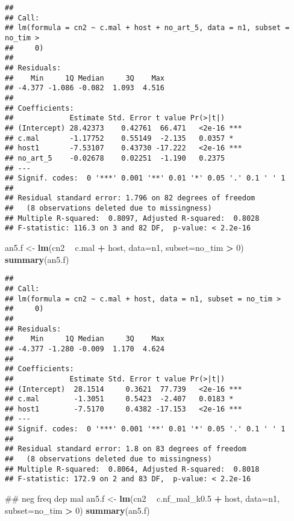 \documentclass[]{article}
\newenvironment{Shaded}{\begin{snugshade}}{\end{snugshade}}
\newcommand{\KeywordTok}[1]{\textcolor[rgb]{0.13,0.29,0.53}{\textbf{#1}}}
\newcommand{\DataTypeTok}[1]{\textcolor[rgb]{0.13,0.29,0.53}{#1}}
\newcommand{\DecValTok}[1]{\textcolor[rgb]{0.00,0.00,0.81}{#1}}
\newcommand{\StringTok}[1]{\textcolor[rgb]{0.31,0.60,0.02}{#1}}
\newcommand{\OperatorTok}[1]{\textcolor[rgb]{0.81,0.36,0.00}{\textbf{#1}}}
\newcommand{\NormalTok}[1]{#1}
\begin{document}
\begin{verbatim}
## 
## Call:
## lm(formula = cn2 ~ c.mal + host + no_art_5, data = n1, subset = no_tim > 
##     0)
## 
## Residuals:
##    Min     1Q Median     3Q    Max 
## -4.377 -1.086 -0.082  1.093  4.516 
## 
## Coefficients:
##             Estimate Std. Error t value Pr(>|t|)    
## (Intercept) 28.42373    0.42761  66.471   <2e-16 ***
## c.mal       -1.17752    0.55149  -2.135   0.0357 *  
## host1       -7.53107    0.43730 -17.222   <2e-16 ***
## no_art_5    -0.02678    0.02251  -1.190   0.2375    
## ---
## Signif. codes:  0 '***' 0.001 '**' 0.01 '*' 0.05 '.' 0.1 ' ' 1
## 
## Residual standard error: 1.796 on 82 degrees of freedom
##   (8 observations deleted due to missingness)
## Multiple R-squared:  0.8097, Adjusted R-squared:  0.8028 
## F-statistic: 116.3 on 3 and 82 DF,  p-value: < 2.2e-16
\end{verbatim}

\begin{Shaded}
\begin{Highlighting}[]
\NormalTok{an5.f <-}\StringTok{ }\KeywordTok{lm}\NormalTok{(cn2 }\OperatorTok{~}\StringTok{ }\NormalTok{c.mal }\OperatorTok{+}\StringTok{ }\NormalTok{host, }\DataTypeTok{data=}\NormalTok{n1, }\DataTypeTok{subset=}\NormalTok{no_tim }\OperatorTok{>}\StringTok{ }\DecValTok{0}\NormalTok{)}
\KeywordTok{summary}\NormalTok{(an5.f) }
\end{Highlighting}
\end{Shaded}

\begin{verbatim}
## 
## Call:
## lm(formula = cn2 ~ c.mal + host, data = n1, subset = no_tim > 
##     0)
## 
## Residuals:
##    Min     1Q Median     3Q    Max 
## -4.377 -1.280 -0.009  1.170  4.624 
## 
## Coefficients:
##             Estimate Std. Error t value Pr(>|t|)    
## (Intercept)  28.1514     0.3621  77.739   <2e-16 ***
## c.mal        -1.3051     0.5423  -2.407   0.0183 *  
## host1        -7.5170     0.4382 -17.153   <2e-16 ***
## ---
## Signif. codes:  0 '***' 0.001 '**' 0.01 '*' 0.05 '.' 0.1 ' ' 1
## 
## Residual standard error: 1.8 on 83 degrees of freedom
##   (8 observations deleted due to missingness)
## Multiple R-squared:  0.8064, Adjusted R-squared:  0.8018 
## F-statistic: 172.9 on 2 and 83 DF,  p-value: < 2.2e-16
\end{verbatim}

\begin{Shaded}
\begin{Highlighting}[]
\NormalTok{## neg freq dep mal}
\NormalTok{an5.f <-}\StringTok{ }\KeywordTok{lm}\NormalTok{(cn2 }\OperatorTok{~}\StringTok{ }\NormalTok{c.nf_mal_k0.}\DecValTok{5} \OperatorTok{+}\StringTok{ }\NormalTok{host, }\DataTypeTok{data=}\NormalTok{n1, }\DataTypeTok{subset=}\NormalTok{no_tim }\OperatorTok{>}\StringTok{ }\DecValTok{0}\NormalTok{)}
\KeywordTok{summary}\NormalTok{(an5.f)}
\end{Highlighting}
\end{Shaded}
\end{document}
